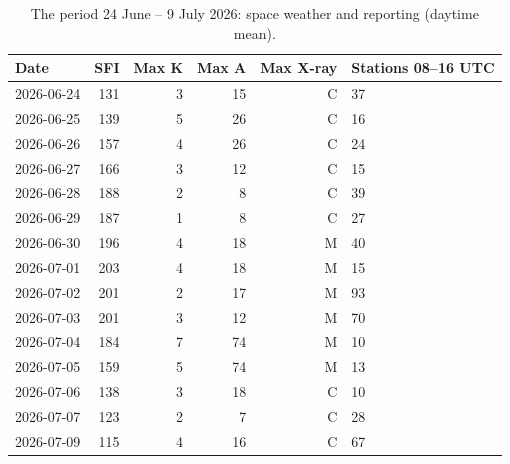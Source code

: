 \begin{table}[htbp]\centering\small
\caption{The period 24 June -- 9 July 2026: space weather and reporting (daytime mean).}\label{tab:case}
\begin{tabular}{lrrrrl}
\toprule
Date & SFI & Max K & Max A & Max X-ray & Stations 08--16 UTC \\
\midrule
2026-06-24 & 131 & 3 & 15 & C & 37 \\
2026-06-25 & 139 & 5 & 26 & C & 16 \\
2026-06-26 & 157 & 4 & 26 & C & 24 \\
2026-06-27 & 166 & 3 & 12 & C & 15 \\
2026-06-28 & 188 & 2 & 8 & C & 39 \\
2026-06-29 & 187 & 1 & 8 & C & 27 \\
2026-06-30 & 196 & 4 & 18 & M & 40 \\
2026-07-01 & 203 & 4 & 18 & M & 15 \\
2026-07-02 & 201 & 2 & 17 & M & 93 \\
2026-07-03 & 201 & 3 & 12 & M & 70 \\
2026-07-04 & 184 & 7 & 74 & M & 10 \\
2026-07-05 & 159 & 5 & 74 & M & 13 \\
2026-07-06 & 138 & 3 & 18 & C & 10 \\
2026-07-07 & 123 & 2 & 7 & C & 28 \\
2026-07-09 & 115 & 4 & 16 & C & 67 \\
\bottomrule
\end{tabular}
\end{table}

